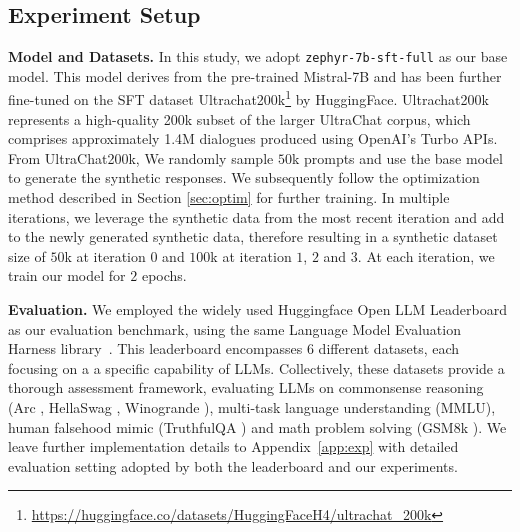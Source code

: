 \documentclass{article}
\newcommand{\todoq}[2][]{\todo[size=\scriptsize,color=orange!20!white,#1]{Quanquan: #2}}
\begin{document}
\subsection{Experiment Setup}\label{sec:exp}
\noindent \textbf{Model and Datasets.}
In this study, we adopt \texttt{zephyr-7b-sft-full} as our base model.  
This model derives from the pre-trained Mistral-7B \citep{jiang2023mistral} and has been further fine-tuned on the SFT dataset Ultrachat200k\footnote{\url{https://huggingface.co/datasets/HuggingFaceH4/ultrachat_200k}} by HuggingFace.
Ultrachat200k represents a high-quality 200k subset of the larger UltraChat \citep{ding2023enhancing} corpus, which comprises approximately 1.4M dialogues produced using OpenAI's Turbo APIs.
From UltraChat200k, We randomly sample $50$k prompts and use the base model to generate the synthetic responses. %
We subsequently follow the optimization method described in Section \ref{sec:optim} for further training. 
In multiple iterations, we leverage the synthetic data from the most recent iteration and add to the newly generated synthetic data, therefore resulting in a synthetic dataset size of $50$k at iteration $0$ and $100$k at iteration $1$, $2$ and $3$. At each iteration, we train our model for $2$ epochs.


\noindent \textbf{Evaluation.}
We employed the widely used Huggingface Open LLM Leaderboard \citep{open-llm-leaderboard} as our evaluation benchmark, using the same Language Model Evaluation Harness library~\citep{eval-harness}. 
This leaderboard encompasses 6 different datasets, each focusing on a a specific capability of LLMs.
Collectively, these datasets provide a thorough assessment framework, evaluating LLMs on commonsense reasoning (Arc \citep{clark2018think}, HellaSwag \citep{zellers2019hellaswag}, Winogrande \citep{sakaguchi2021winogrande}), multi-task language understanding (MMLU\citep{hendrycks2020measuring}), human falsehood mimic (TruthfulQA \citep{lin2021truthfulqa}) and math problem solving (GSM8k \citep{cobbe2021training}). 
We leave further implementation details to Appendix~\ref{app:exp} with detailed evaluation setting adopted by both the leaderboard and our experiments.
\end{document}
